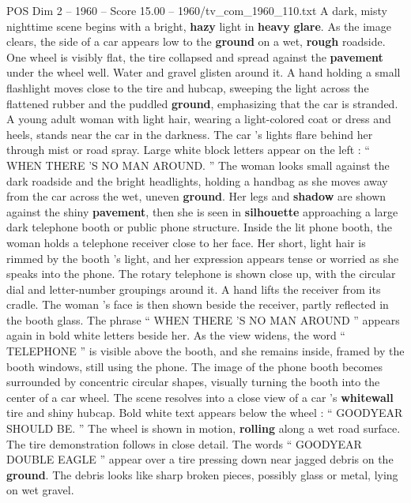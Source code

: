 \begin{textsample}{POS Dim 2 – 1960 – Score 15.00 – 1960/tv\_com\_1960\_110.txt}  \label{ex:f2_pos_016}
A dark, misty nighttime scene begins with a bright, \textbf{hazy} light in \textbf{heavy} \textbf{glare}.
As the image clears, the side of a car appears low to the \textbf{ground} on a wet, \textbf{rough} roadside.
One wheel is visibly flat, the tire collapsed and spread against the \textbf{pavement} under the wheel well.
Water and gravel glisten around it.
A hand holding a small flashlight moves close to the tire and hubcap, sweeping the light across the flattened rubber and the puddled \textbf{ground}, emphasizing that the car is stranded.
A young adult woman with light hair, wearing a light-colored coat or dress and heels, stands near the car in the darkness.
The car ’s lights flare behind her through mist or road spray.
Large white block letters appear on the left : “ WHEN THERE ’S NO MAN AROUND. ” The woman looks small against the dark roadside and the bright headlights, holding a handbag as she moves away from the car across the wet, uneven \textbf{ground}.
Her legs and \textbf{shadow} are shown against the shiny \textbf{pavement}, then she is seen in \textbf{silhouette} approaching a large dark telephone booth or public phone structure.
Inside the lit phone booth, the woman holds a telephone receiver close to her face.
Her short, light hair is rimmed by the booth ’s light, and her expression appears tense or worried as she speaks into the phone.
The rotary telephone is shown close up, with the circular dial and letter-number groupings around it.
A hand lifts the receiver from its cradle.
The woman ’s face is then shown beside the receiver, partly reflected in the booth glass.
The phrase “ WHEN THERE ’S NO MAN AROUND ” appears again in bold white letters beside her.
As the view widens, the word “ TELEPHONE ” is visible above the booth, and she remains inside, framed by the booth windows, still using the phone.
The image of the phone booth becomes surrounded by concentric circular shapes, visually turning the booth into the center of a car wheel.
The scene resolves into a close view of a car ’s \textbf{whitewall} tire and shiny hubcap.
Bold white text appears below the wheel : “ GOODYEAR SHOULD BE. ” The wheel is shown in motion, \textbf{rolling} along a wet road surface.
The tire demonstration follows in close detail.
The words “ GOODYEAR DOUBLE EAGLE ” appear over a tire pressing down near jagged debris on the \textbf{ground}.
The debris looks like sharp broken pieces, possibly glass or metal, lying on wet gravel.

\end{textsample}
